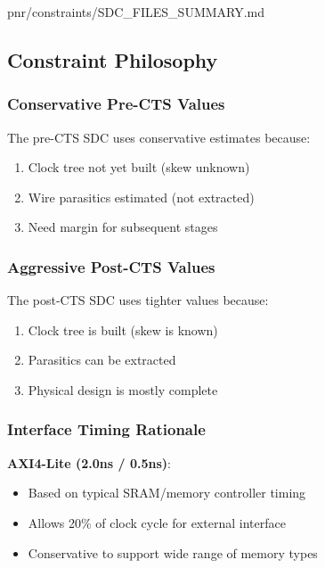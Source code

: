 \begin{relocated}{pnr/constraints/SDC_FILES_SUMMARY.md}
\subsection{Constraint Philosophy}\label{tm:pd:constraints-sdc-files-summary:constraint-philosophy}

\subsubsection{Conservative Pre-CTS Values}\label{tm:pd:constraints-sdc-files-summary:conservative-pre-cts-values}

The pre-CTS SDC uses conservative estimates because:

\begin{enumerate}
\def\labelenumi{\arabic{enumi}.}
\tightlist
\item
  Clock tree not yet built (skew unknown)
\item
  Wire parasitics estimated (not extracted)
\item
  Need margin for subsequent stages
\end{enumerate}

\subsubsection{Aggressive Post-CTS Values}\label{tm:pd:constraints-sdc-files-summary:aggressive-post-cts-values}

The post-CTS SDC uses tighter values because:

\begin{enumerate}
\def\labelenumi{\arabic{enumi}.}
\tightlist
\item
  Clock tree is built (skew is known)
\item
  Parasitics can be extracted
\item
  Physical design is mostly complete
\end{enumerate}

\subsubsection{Interface Timing Rationale}\label{tm:pd:constraints-sdc-files-summary:interface-timing-rationale}

\textbf{AXI4-Lite (2.0ns / 0.5ns)}:

\begin{itemize}
\tightlist
\item
  Based on typical SRAM/\allowbreak{}memory controller timing
\item
  Allows 20\% of clock cycle for external interface
\item
  Conservative to support wide range of memory types
\end{itemize}


\end{relocated}
